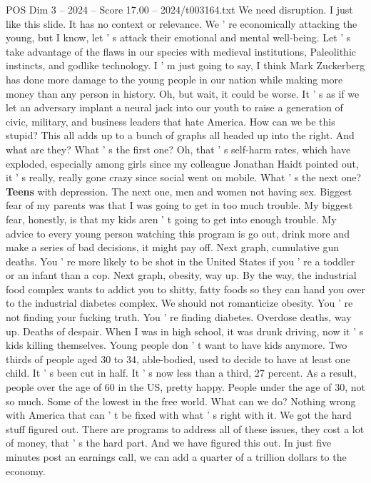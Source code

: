 \begin{textsample}{POS Dim 3 – 2024 – Score 17.00 – 2024/t003164.txt}
We need disruption.
I just like this slide.
It has no context or relevance.
We ' re economically attacking the young, but I know, let ' s attack their emotional and mental well-being.
Let ' s take advantage of the flaws in our species with medieval institutions, Paleolithic instincts, and godlike technology.
I ' m just going to say, I think Mark Zuckerberg has done more damage to the young people in our nation while making more money than any person in history.
Oh, but wait, it could be worse.
It ' s as if we let an adversary implant a neural jack into our youth to raise a generation of civic, military, and business leaders that hate America.
How can we be this stupid?
This all adds up to a bunch of graphs all headed up into the right.
And what are they?
What ' s the first one?
Oh, that ' s self-harm rates, which have exploded, especially among girls since my colleague Jonathan Haidt pointed out, it ' s really, really gone crazy since social went on mobile.
What ' s the next one? \textbf{Teens} with depression.
The next one, men and women not having sex.
Biggest fear of my parents was that I was going to get in too much trouble.
My biggest fear, honestly, is that my kids aren ' t going to get into enough trouble.
My advice to every young person watching this program is go out, drink more and make a series of bad decisions, it might pay off.
Next graph, cumulative gun deaths.
You ' re more likely to be shot in the United States if you ' re a toddler or an infant than a cop.
Next graph, obesity, way up.
By the way, the industrial food complex wants to addict you to shitty, fatty foods so they can hand you over to the industrial diabetes complex.
We should not romanticize obesity.
You ' re not finding your fucking truth.
You ' re finding diabetes.
Overdose deaths, way up.
Deaths of despair.
When I was in high school, it was drunk driving, now it ' s kids killing themselves.
Young people don ' t want to have kids anymore.
Two thirds of people aged 30 to 34, able-bodied, used to decide to have at least one child.
It ' s been cut in half.
It ' s now less than a third, 27 percent.
As a result, people over the age of 60 in the US, pretty happy.
People under the age of 30, not so much.
Some of the lowest in the free world.
What can we do?
Nothing wrong with America that can ' t be fixed with what ' s right with it.
We got the hard stuff figured out.
There are programs to address all of these issues, they cost a lot of money, that ' s the hard part.
And we have figured this out.
In just five minutes post an earnings call, we can add a quarter of a trillion dollars to the economy.

\end{textsample}
